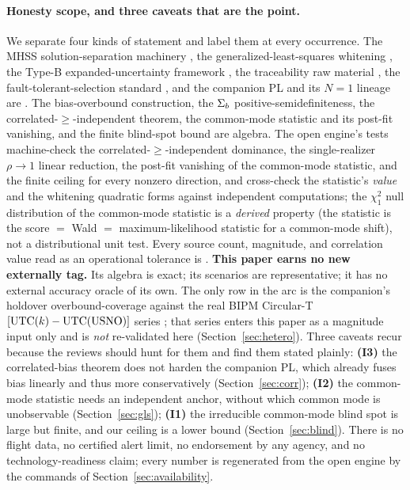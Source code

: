\paragraph{Honesty scope, and three caveats that are the point.}
We separate four kinds of statement and label them at every occurrence. The MHSS
solution-separation machinery \citep{blanch2015,joerger2014}, the generalized-least-squares
whitening \citep{aitken1935}, the Type-B expanded-uncertainty framework
\citep{jcgm100}, the traceability raw material \citep{defraigne2015,panfilo2019,bipmcirculart},
the fault-tolerant-selection standard \citep{ieee8021ased}, and the companion PL and
its $N=1$ lineage \citep{baweja2026cti,baweja2026tpl} are \Cited{}. The bias-overbound
construction, the $\Sigma_{b}{}$ positive-semidefiniteness, the correlated-$\ge$-independent
theorem, the common-mode statistic and its post-fit vanishing, and the finite
blind-spot bound are \Proven{} algebra. The open engine's tests machine-check the
correlated-$\ge$-independent dominance, the single-realizer $\rho\!\to\!1$ linear
reduction, the post-fit vanishing of the common-mode statistic, and the finite
ceiling for every nonzero direction, and cross-check the statistic's \emph{value}
and the whitening quadratic forms against independent  computations; the
$\chi^2_1$ null distribution of the common-mode statistic is a \Proven{} \emph{derived}
property (the statistic is the score $=$ Wald $=$ maximum-likelihood statistic for a
common-mode shift), not a distributional unit test. Every source count, magnitude,
and correlation value read as an operational tolerance is \Modelled{}. \textbf{This paper earns no new externally \Validated{}
tag.} Its algebra is exact; its scenarios are representative; it has no external
accuracy oracle of its own. The only \Validated{} row in the arc is the companion's
holdover overbound-coverage against the real BIPM Circular-T
$[\mathrm{UTC}(k){}-\mathrm{UTC(USNO)}]$ series \citep{baweja2026cti}; that series enters this
paper as a \Cited{} magnitude input only and is \emph{not} re-validated here
(Section~\ref{sec:hetero}). Three caveats recur because the reviews should hunt for
them and find them stated plainly: \textbf{(I3)} the correlated-bias theorem does
not harden the companion PL, which already fuses bias linearly and thus more
conservatively (Section~\ref{sec:corr}); \textbf{(I2)} the common-mode statistic
needs an independent anchor, without which common mode is unobservable
(Section~\ref{sec:gls}); \textbf{(I1)} the irreducible common-mode blind spot is
large but finite, and our ceiling is a lower bound (Section~\ref{sec:blind}). There
is no flight data, no certified alert limit, no endorsement by any agency, and no
technology-readiness claim; every number is regenerated from the open engine by the
commands of Section~\ref{sec:availability}.
